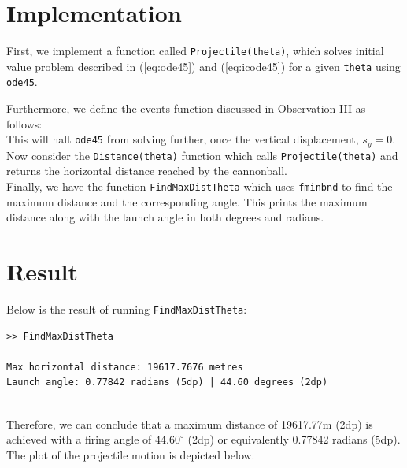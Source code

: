\documentclass[11pt]{report}
\begin{document}
\section{Implementation}
First, we implement a function called \texttt{Projectile(theta)}, which solves initial value problem described in (\ref{eq:ode45}) and (\ref{eq:icode45}) for a given \texttt{theta} using \texttt{ode45}.



Furthermore, we define the events function discussed in Observation III as follows:\\




This will halt \texttt{ode45} from solving further, once the vertical displacement, $s_y=0$. Now consider the \texttt{Distance(theta)} function which calls \texttt{Projectile(theta)} and returns the horizontal distance reached by the cannonball.\\



Finally, we have the function \texttt{FindMaxDistTheta} which uses \texttt{fminbnd} to find the maximum distance and the corresponding angle. This prints the maximum distance along with the launch angle in both degrees and radians.


\section{Result}
Below is the result of running \texttt{FindMaxDistTheta}:

\begin{lstlisting}
>> FindMaxDistTheta

Max horizontal distance: 19617.7676 metres
Launch angle: 0.77842 radians (5dp) | 44.60 degrees (2dp)
\end{lstlisting}
\ \\
Therefore, we can conclude that a maximum distance of 19617.77m (2dp) is achieved with a firing angle of $44.60^{\circ}$ (2dp) or equivalently 0.77842 radians (5dp). The plot of the projectile motion is depicted below.
\end{document}
